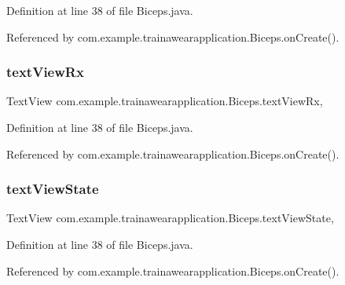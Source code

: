 Definition at line 38 of file Biceps.\+java.



Referenced by com.\+example.\+trainawearapplication.\+Biceps.\+on\+Create().

\mbox{\label{classcom_1_1example_1_1trainawearapplication_1_1_biceps_a36a9f57755bc33b820b2922ccc4dc864}} 
\subsubsection{\texorpdfstring{textViewRx}{textViewRx}}
{\footnotesize\ttfamily Text\+View com.\+example.\+trainawearapplication.\+Biceps.\+text\+View\+Rx\hspace{0.3cm}{\ttfamily [static]}, {\ttfamily [package]}}



Definition at line 38 of file Biceps.\+java.



Referenced by com.\+example.\+trainawearapplication.\+Biceps.\+on\+Create().

\mbox{\label{classcom_1_1example_1_1trainawearapplication_1_1_biceps_ae385412b8ad17ab4bda6561d405b117c}} 
\subsubsection{\texorpdfstring{textViewState}{textViewState}}
{\footnotesize\ttfamily Text\+View com.\+example.\+trainawearapplication.\+Biceps.\+text\+View\+State\hspace{0.3cm}{\ttfamily [static]}, {\ttfamily [package]}}



Definition at line 38 of file Biceps.\+java.



Referenced by com.\+example.\+trainawearapplication.\+Biceps.\+on\+Create().

